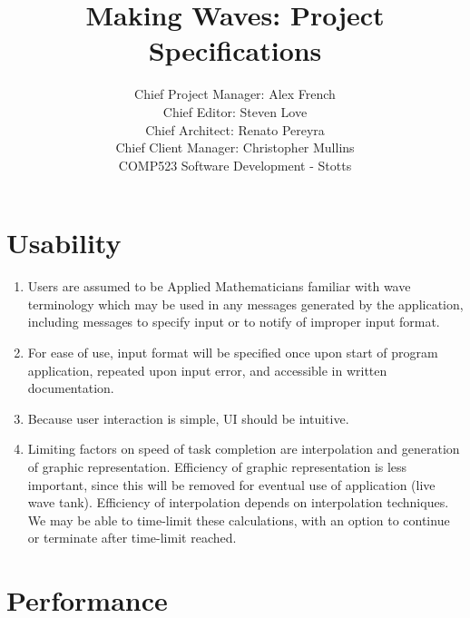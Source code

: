 \documentclass[12pt]{article}
\begin{document}

\title{Making Waves: Project Specifications}%
\author{Chief Project Manager: Alex French \\ 
Chief Editor: Steven Love\\
Chief Architect: Renato Pereyra\\
Chief Client Manager: Christopher Mullins\\ %
COMP523 Software Development - Stotts} %

\maketitle

\section{Usability}  %


\begin{enumerate}
\item Users are assumed to be Applied Mathematicians familiar with wave terminology which may be used in any messages generated by the application, including messages to specify input or to notify of improper input format.
\item For ease of use, input format will be specified once upon start of program application, repeated upon input error, and accessible in written documentation.
\item Because user interaction is simple, UI should be intuitive.
\item Limiting factors on speed of task completion are interpolation and generation of graphic representation. Efficiency of graphic representation is less important, since this will be removed for eventual use of application (live wave tank). Efficiency of interpolation depends on interpolation techniques. We may be able to time-limit these calculations, with an option to continue or terminate after time-limit reached.
\end{enumerate}

\section{Performance}
\end{document}
